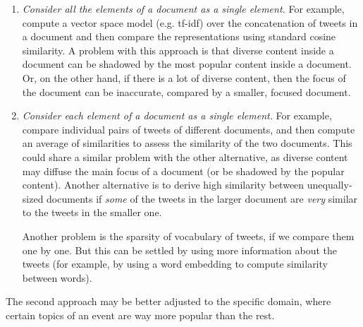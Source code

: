 \documentclass[12pt]{article}
\begin{document}
\begin{enumerate}
\item {\em Consider all the elements of a document as a single element.}
For example, compute a vector space model (e.g. tf-idf) over the
concatenation of tweets in a document and then compare the
representations using standard cosine similarity. A problem with this
approach is that diverse content inside a document can be shadowed by
the most popular content inside a document. Or, on the other hand, if
there is a lot of diverse content, then the focus of the document can
be inaccurate, compared by a smaller, focused document.

\item {\em Consider each element of a document as a single element.}
For example, compare individual pairs of tweets of different
documents, and then compute an average of similarities to assess the
similarity of the two documents. This could share a similar problem
with the other alternative, as diverse content may diffuse the main
focus of a document (or be shadowed by the popular content). Another
alternative is to derive high similarity between unequally-sized
documents if {\em some} of the tweets in the larger document are {\em
very} similar to the tweets in the smaller one.

Another problem is the sparsity of vocabulary of tweets, if we compare
them one by one. But this can be settled by using more information
about the tweets (for example, by using a word embedding to compute
similarity between words).
\end{enumerate}

The second approach may be better adjusted to the specific domain,
where certain topics of an event are way more popular than the rest. 


%
%
\end{document}
